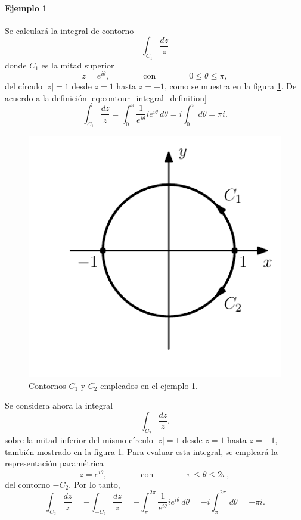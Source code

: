 \documentclass[a4paper]{report}
\begin{document}
\paragraph{Ejemplo 1} Se calculará la integral de contorno
\[
 \int_{C_1}\frac{dz}{z}
\]
donde \(C_1\) es la mitad superior
\[
 z=e^{i\theta},\qquad\qquad\textrm{con}\qquad\qquad 0\leq\theta\leq\pi, 
\]
del círculo \(|z|=1\) desde \(z=1\) hasta \(z=-1\), como se muestra en la figura \ref{fig:example_45_01}. De acuerdo a la definición \ref{eq:contour_integral_definition}
\begin{equation}\label{eq:example_45_01_integral_c1}
 \int_{C_1}\frac{dz}{z}=\int_0^\pi\frac{1}{e^{i\theta}}ie^{i\theta}\,d\theta=i\int_0^\pi\,d\theta=\pi i. 
\end{equation}
\begin{figure}[!htb]
  \begin{minipage}[c]{0.35\textwidth}
    \includegraphics[width=\textwidth]{figuras/example_45_01.pdf}
  \end{minipage}\hfill
  \begin{minipage}[c]{0.55\textwidth}
    \caption{
        Contornos \(C_1\) y \(C_2\) empleados en el ejemplo 1.
    }\label{fig:example_45_01}
  \end{minipage}
\end{figure}

Se considera ahora la integral
\[
 \int_{C_2}\frac{dz}{z}.
\]
sobre la mitad inferior del mismo círculo \(|z|=1\) desde \(z=1\) hasta \(z=-1\), también mostrado en la figura \ref{fig:example_45_01}. Para evaluar esta integral, se empleará la representación paramétrica  
\[
 z=e^{i\theta},\qquad\qquad\textrm{con}\qquad\qquad \pi\leq\theta\leq2\pi, 
\]
del contorno \(-C_2\). Por lo tanto,
\begin{equation}\label{eq:example_45_01_integral_c2}
 \int_{C_2}\frac{dz}{z}=-\int_{-C_2}\frac{dz}{z}=-\int_\pi^{2\pi}\frac{1}{e^{i\theta}}ie^{i\theta}\,d\theta=-i\int_\pi^{2\pi}\,d\theta=-\pi i. 
\end{equation}
\end{document}

